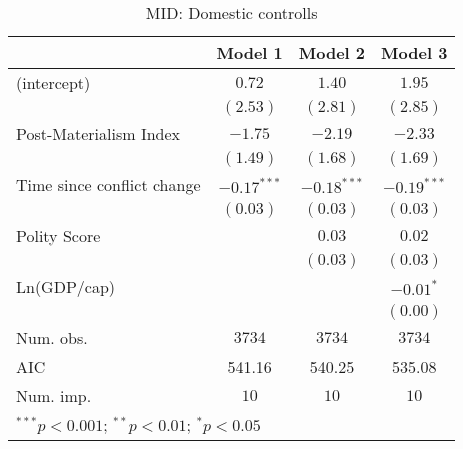 
\begin{table}
\begin{center}
\begin{tabular}{l c c c}
\toprule
 & Model 1 & Model 2 & Model 3 \\
\midrule
(intercept)                & $0.72$        & $1.40$        & $1.95$        \\
                           & $(2.53)$      & $(2.81)$      & $(2.85)$      \\
Post-Materialism Index     & $-1.75$       & $-2.19$       & $-2.33$       \\
                           & $(1.49)$      & $(1.68)$      & $(1.69)$      \\
Time since conflict change & $-0.17^{***}$ & $-0.18^{***}$ & $-0.19^{***}$ \\
                           & $(0.03)$      & $(0.03)$      & $(0.03)$      \\
Polity Score               &               & $0.03$        & $0.02$        \\
                           &               & $(0.03)$      & $(0.03)$      \\
Ln(GDP/cap)                &               &               & $-0.01^{*}$   \\
                           &               &               & $(0.00)$      \\
\midrule
Num. obs.                  & $3734$        & $3734$        & $3734$        \\
AIC                        & 541.16        & 540.25        & 535.08        \\
Num. imp.                  & $10$          & $10$          & $10$          \\
\bottomrule
\multicolumn{4}{l}{\scriptsize{$^{***}p<0.001$; $^{**}p<0.01$; $^{*}p<0.05$}}
\end{tabular}
\caption{MID: Domestic controlls}
\label{MID_1_PM}
\end{center}
\end{table}
